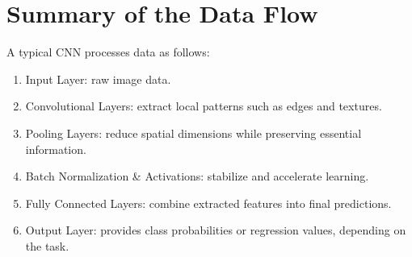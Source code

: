 \section{Summary of the Data Flow}

A typical CNN processes data as follows:
\begin{enumerate}
    \item Input Layer: raw image data.
    \item Convolutional Layers: extract local patterns such as edges and textures.
    \item Pooling Layers: reduce spatial dimensions while preserving essential information.
    \item Batch Normalization \& Activations: stabilize and accelerate learning.
    \item Fully Connected Layers: combine extracted features into final predictions.
    \item Output Layer: provides class probabilities or regression values, depending on the task.
\end{enumerate}